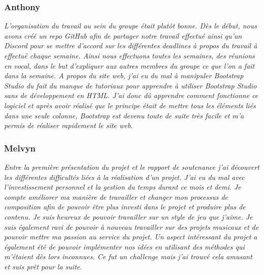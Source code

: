 \documentclass[a4paper,12pt]{article}
\begin{document}
        \subsubsection{Anthony}
        \textit{L’organisation du travail au sein du groupe était plutôt bonne.
        Dès le début, nous avons créé un repo \textsl{GitHub} afin de partager notre travail 
        effectué ainsi qu’un \textsl{Discord} pour se mettre d’accord sur les différentes 
        deadlines à propos du travail à effectué chaque semaine. Ainsi nous 
        effectuons toutes les semaines, des réunions en vocal, dans le but 
        d’expliquer aux autres membres du groupe ce que l’on a fait dans la 
        semaine. A propos du site web, j’ai eu du mal à manipuler \textsl{Bootstrap Studio} 
        du fait du manque de tutoriaux pour apprendre à utiliser \textsl{Bootstrap Studio}
        sans de développement en HTML. J’ai donc dû apprendre comment fonctionne 
        ce logiciel et après avoir réalisé que le principe était de mettre tous 
        les éléments liés dans une seule colonne, \textsl{Bootstrap} est devenu toute de 
        suite très facile et m’a permis de réaliser rapidement le site web.}
  
        \subsubsection{Melvyn}
        \textit{Entre la première présentation du projet et le rapport de soutenance
        j'ai découvert les différentes difficultés liées à la réalisation d'un projet.
        J'ai eu du mal avec l'investissement personnel et la gestion du temps durant 
        ce mois et demi. Je compte améliorer ma manière de travailler et changer mon
        processus de composition afin de pouvoir être plus investi dans le projet et 
        produire plus de contenu. Je suis heureux de pouvoir travailler sur un style de 
        jeu que j'aime. Je suis également ravi de pouvoir à nouveau travailler sur des
        projets musicaux et de pouvoir mettre ma passion au service du projet.
        Un aspect intéressant du projet a également été de pouvoir implémenter nos idées
        en utilisant des méthodes qui m'étaient dès lors inconnues. Ce fut un challenge 
        mais j'ai trouvé cela amusant et suis prêt pour la suite.}
 
\end{document}
